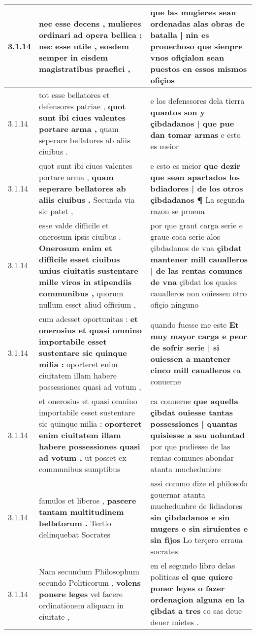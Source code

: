 \begin{tabular}{|p{1cm}|p{6.5cm}|p{6.5cm}|}
3.1.14 & nec esse decens , \textbf{ mulieres ordinari ad opera bellica ; nec esse utile , } eosdem semper in eisdem magistratibus praefici , & que las mugieres sean ordenadas \textbf{ alas obras de batalla | nin es prouechoso } que sienpre vnos ofiçialon sean puestos en essos mismos ofiçios \\\hline
3.1.14 & tot esse bellatores et defensores patriae , \textbf{ quot sunt ibi ciues valentes portare arma , } quam seperare bellatores ab aliis ciuibus . & e los defenssores dela tierra \textbf{ quantos son y çibdadanos | que pue dan tomar armas } e esto es meior \\\hline
3.1.14 & quot sunt ibi ciues valentes portare arma , \textbf{ quam seperare bellatores ab aliis ciuibus . } Secunda via sic patet , & e esto es meior \textbf{ que dezir que sean apartados los bdiadores | de los otros çibdadanos ¶ } La segunda razon se prueua \\\hline
3.1.14 & esse valde difficile et onerosum ipsis ciuibus . \textbf{ Onerosum enim et difficile esset ciuibus unius ciuitatis sustentare mille viros in stipendiis communibus , } quorum nullum esset aliud officium , & por que grant carga serie e graue cosa serie alos çibdadanos de vna \textbf{ çibdat mantener mill caualleros | de las rentas comunes de vna } çibdat los quales caualleros non ouiessen otro ofiçio ninguno \\\hline
3.1.14 & cum adesset oportunitas : \textbf{ et onerosius et quasi omnino importabile esset sustentare sic quinque milia : } oporteret enim ciuitatem illam habere possessiones quasi ad votum , & quando fuesse me este \textbf{ Et muy mayor carga e peor de sofrir serie | si ouiessen a mantener cinco mill caualleros } ca conuerne \\\hline
3.1.14 & et onerosius et quasi omnino importabile esset sustentare sic quinque milia : \textbf{ oporteret enim ciuitatem illam habere possessiones quasi ad votum , } ut posset ex communibus sumptibus & ca conuerne \textbf{ que aquella çibdat ouiesse tantas possessiones | quantas quisiesse a ssu uoluntad } por que pudiesse de las rentas comunes abondar atanta muchedunbre \\\hline
3.1.14 & famulos et liberos , \textbf{ pascere tantam multitudinem bellatorum . } Tertio delinquebat Socrates & assi commo dize el philosofo gouernar atanta muchedunbre de lidiadores \textbf{ sin çibdadanos e sin mugers e sin siruientes e sin fijos } Lo terçero erraua socrates \\\hline
3.1.14 & Nam secundum Philosophum secundo Politicorum , \textbf{ volens ponere leges } vel facere ordinationem aliquam in ciuitate , & en el segundo libro delas politicas \textbf{ el que quiere poner leyes o fazer ordenaçion alguna en la çibdat a tres } co sas deue deuer mietes . \\\hline

\end{tabular}
